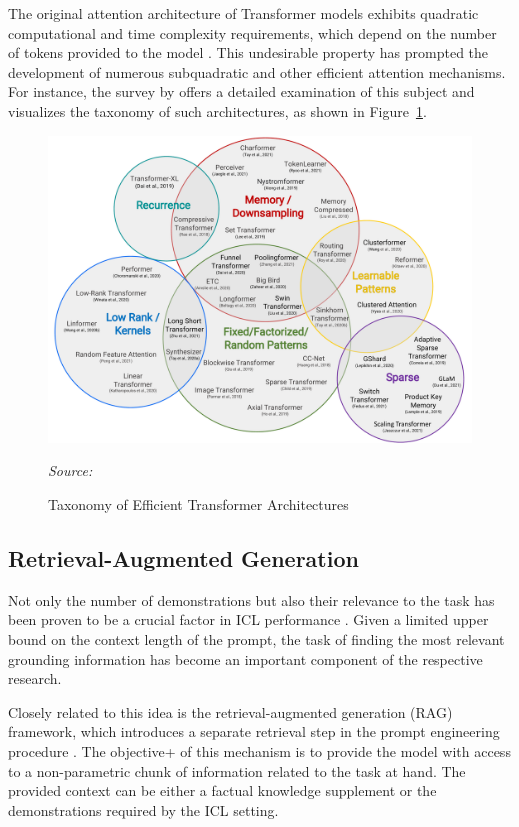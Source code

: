 The original attention architecture of Transformer models exhibits quadratic computational and time complexity requirements, which depend on the number of tokens provided to the model \parencite{vaswani2017}. This undesirable property has prompted the development of numerous subquadratic and other efficient attention mechanisms. For instance, the survey by \citet{tay2022} offers a detailed examination of this subject and visualizes the taxonomy of such architectures, as shown in Figure~\ref{fig:taxonomy-of-transformers}.

\begin{figure}[ht]
    \centering
    \includegraphics[width=\textwidth]{figures/taxonomy-of-transformers.pdf}
    \caption{Taxonomy of Efficient Transformer Architectures}\label{fig:taxonomy-of-transformers}
    \hfill\textit{Source: \citet{tay2022}}
\end{figure}

\subsection{Retrieval-Augmented Generation}

Not only the number of demonstrations but also their relevance to the task has been proven to be a crucial factor in ICL performance \parencite{liu2021}. Given a limited upper bound on the context length of the prompt, the task of finding the most relevant grounding information has become an important component of the respective research.

Closely related to this idea is the retrieval-augmented generation (RAG) framework, which introduces a separate retrieval step in the prompt engineering procedure \parencite{lewis2020}. The objective+ of this mechanism is to provide the model with access to a non-parametric chunk of information related to the task at hand. The provided context can be either a factual knowledge supplement or the demonstrations required by the ICL setting.

